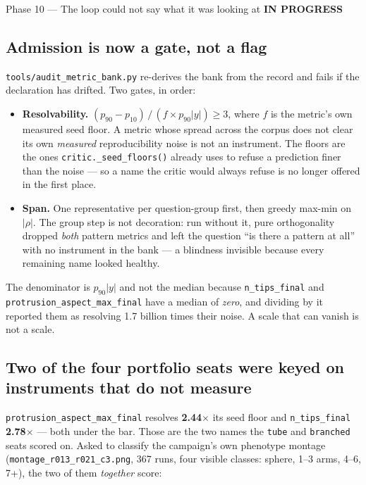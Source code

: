 \documentclass[11pt,a4paper]{article}
\newcommand{\code}[1]{\texttt{#1}}
\newcommand{\prog}{\textcolor{warn}{\textbf{IN PROGRESS}}}
\begin{document}
\begin{phasebox}{Phase 10 --- The loop could not say what it was looking at \hfill \prog}
\subsection*{Admission is now a gate, not a flag}
\code{tools/audit\_metric\_bank.py} re-derives the bank from the record and fails if the
declaration has drifted. Two gates, in order:

\begin{itemize}\itemsep2pt
\item \textbf{Resolvability.} $(p_{90}-p_{10}) \, / \, (f \times p_{90}|y|) \ge 3$, where $f$ is
      the metric's own measured seed floor. A
      metric whose spread across the corpus does not clear its own \emph{measured} reproducibility
      noise is not an instrument. The floors are the ones \code{critic.\_seed\_floors()} already
      uses to refuse a prediction finer than the noise --- so a name the critic would always refuse
      is no longer offered in the first place.
\item \textbf{Span.} One representative per question-group first, then greedy max-min on
      $|\rho|$. The group step is not decoration: run without it, pure orthogonality dropped
      \emph{both} pattern metrics and left the question ``is there a pattern at all'' with no
      instrument in the bank --- a blindness invisible because every remaining name looked healthy.
\end{itemize}

\noindent The denominator is $p_{90}|y|$ and not the median because \code{n\_tips\_final} and
\code{protrusion\_aspect\_max\_final} have a median of \emph{zero}, and dividing by it reported
them as resolving 1.7 billion times their noise. A scale that can vanish is not a scale.

\subsection*{Two of the four portfolio seats were keyed on instruments that do not measure}
\code{protrusion\_aspect\_max\_final} resolves \textbf{2.44$\times$} its seed floor and
\code{n\_tips\_final} \textbf{2.78$\times$} --- both under the bar. Those are the two names the
\code{tube} and \code{branched} seats scored on. Asked to classify the campaign's own phenotype
montage (\code{montage\_r013\_r021\_c3.png}, 367 runs, four visible classes: sphere, 1--3 arms,
4--6, 7+), the two of them \emph{together} score:


\end{phasebox}
\end{document}
